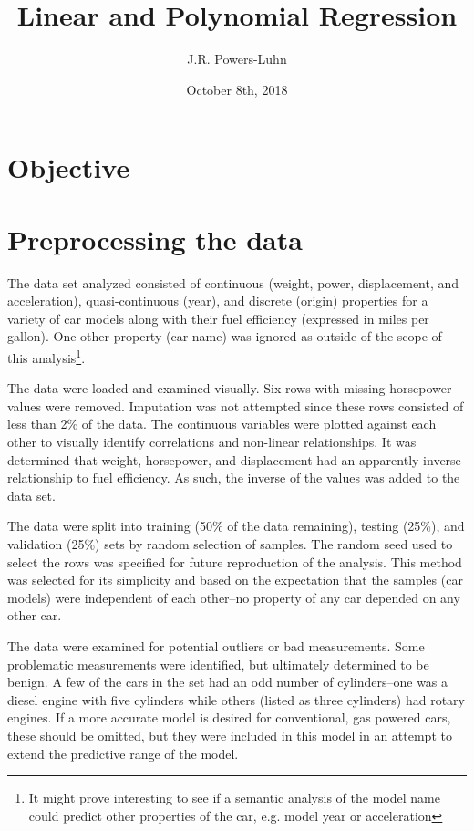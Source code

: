 \documentclass{article}
\title{Linear and Polynomial Regression}
\author{J.R. Powers-Luhn}
\date{October 8th, 2018}
\begin{document}
\maketitle

\section{Objective}

\section{Preprocessing the data}

The data set analyzed consisted of continuous (weight, power, displacement, and acceleration), quasi-continuous (year), and discrete (origin) properties for a variety of car models along with their fuel efficiency (expressed in miles per gallon). One other property (car name) was ignored as outside of the scope of this analysis\footnote{It might prove interesting to see if a semantic analysis of the model name could predict other properties of the car, e.g. model year or acceleration}.

The data were loaded and examined visually. Six rows with missing horsepower values were removed. 
Imputation was not attempted since these rows consisted of less than 2\% of the data. The 
continuous variables were plotted against each other to visually identify correlations and 
non-linear relationships. It was determined that weight, horsepower, and displacement had an 
apparently inverse relationship to fuel efficiency. As such, the inverse of the values was 
added to the data set.

The data were split into training (50\% of the data remaining), testing (25\%), and validation (25\%) sets by random selection of samples. The random seed used to select the rows was specified for future reproduction of the analysis. This method was selected for its simplicity and based on the expectation that the samples (car models) were independent of each other--no property of any car depended on any other car.

The data were examined for potential outliers or bad measurements. Some problematic measurements were identified, but ultimately determined to be benign. A few of the cars in the set had an odd number of cylinders--one was a diesel engine with five cylinders while others (listed as three cylinders) had rotary engines. If a more accurate model is desired for conventional, gas powered cars, these should be omitted, but they were included in this model in an attempt to extend the predictive range of the model.
\end{document}
